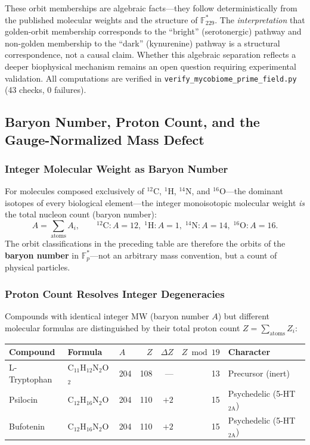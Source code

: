 \begin{remark}
These orbit memberships are algebraic facts---they follow deterministically
from the published molecular weights and the structure of $\mathbb{F}_{229}^*$.
The \emph{interpretation} that golden-orbit membership corresponds to
the ``bright'' (serotonergic) pathway and non-golden membership to the
``dark'' (kynurenine) pathway is a structural correspondence, not a
causal claim. Whether this algebraic separation reflects a deeper
biophysical mechanism remains an open question requiring experimental
validation. All computations are verified in
\texttt{verify\_mycobiome\_prime\_field.py} (43 checks, 0 failures).
\end{remark}

\subsection{Baryon Number, Proton Count, and the Gauge-Normalized Mass Defect}

\subsubsection{Integer Molecular Weight as Baryon Number}

For molecules composed exclusively of ${}^{12}$C, ${}^{1}$H, ${}^{14}$N, and ${}^{16}$O---the dominant isotopes of every biological element---the integer monoisotopic molecular weight \emph{is} the total nucleon count (baryon number):
\begin{equation}
  A = \sum_{\text{atoms}} A_i, \qquad
  {}^{12}\text{C}: A=12,\; {}^{1}\text{H}: A=1,\;
  {}^{14}\text{N}: A=14,\; {}^{16}\text{O}: A=16.
\end{equation}
The orbit classifications in the preceding table are therefore the orbits of the \textbf{baryon number} in $\mathbb{F}_p^*$---not an arbitrary mass convention, but a count of physical particles.

\subsubsection{Proton Count Resolves Integer Degeneracies}

Compounds with identical integer MW (baryon number $A$) but different molecular formulas are distinguished by their total proton count $Z = \sum_{\text{atoms}} Z_i$:

\begin{center}
\begin{tabular}{@{}lllrrrl@{}}
\toprule
\textbf{Compound} & \textbf{Formula} & $A$ & $Z$ & $\Delta Z$ & $Z \bmod 19$ & \textbf{Character} \\
\midrule
L-Tryptophan & C$_{11}$H$_{12}$N$_2$O$_2$ & 204 & 108 & --- & 13 & Precursor (inert) \\
Psilocin     & C$_{12}$H$_{16}$N$_2$O   & 204 & 110 & $+2$ & 15 & Psychedelic (5-HT$_{2\text{A}}$) \\
Bufotenin    & C$_{12}$H$_{16}$N$_2$O   & 204 & 110 & $+2$ & 15 & Psychedelic (5-HT$_{2\text{A}}$) \\
\bottomrule
\end{tabular}
\end{center}


